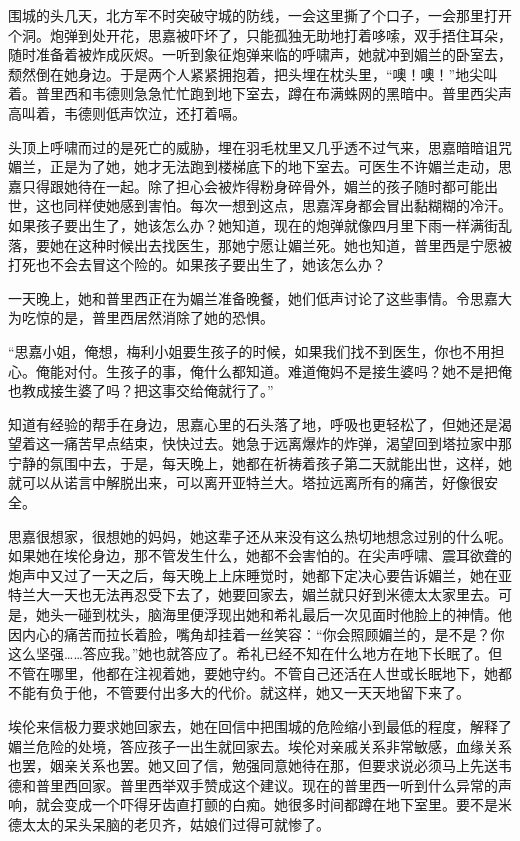 \par 围城的头几天，北方军不时突破守城的防线，一会这里撕了个口子，一会那里打开个洞。炮弹到处开花，思嘉被吓坏了，只能孤独无助地打着哆嗦，双手捂住耳朵，随时准备着被炸成灰烬。一听到象征炮弹来临的呼啸声，她就冲到媚兰的卧室去，颓然倒在她身边。于是两个人紧紧拥抱着，把头埋在枕头里，“噢！噢！”地尖叫着。普里西和韦德则急急忙忙跑到地下室去，蹲在布满蛛网的黑暗中。普里西尖声高叫着，韦德则低声饮泣，还打着嗝。
\par 头顶上呼啸而过的是死亡的威胁，埋在羽毛枕里又几乎透不过气来，思嘉暗暗诅咒媚兰，正是为了她，她才无法跑到楼梯底下的地下室去。可医生不许媚兰走动，思嘉只得跟她待在一起。除了担心会被炸得粉身碎骨外，媚兰的孩子随时都可能出世，这也同样使她感到害怕。每次一想到这点，思嘉浑身都会冒出黏糊糊的冷汗。如果孩子要出生了，她该怎么办？她知道，现在的炮弹就像四月里下雨一样满街乱落，要她在这种时候出去找医生，那她宁愿让媚兰死。她也知道，普里西是宁愿被打死也不会去冒这个险的。如果孩子要出生了，她该怎么办？
\par 一天晚上，她和普里西正在为媚兰准备晚餐，她们低声讨论了这些事情。令思嘉大为吃惊的是，普里西居然消除了她的恐惧。
\par “思嘉小姐，俺想，梅利小姐要生孩子的时候，如果我们找不到医生，你也不用担心。俺能对付。生孩子的事，俺什么都知道。难道俺妈不是接生婆吗？她不是把俺也教成接生婆了吗？把这事交给俺就行了。”
\par 知道有经验的帮手在身边，思嘉心里的石头落了地，呼吸也更轻松了，但她还是渴望着这一痛苦早点结束，快快过去。她急于远离爆炸的炸弹，渴望回到塔拉家中那宁静的氛围中去，于是，每天晚上，她都在祈祷着孩子第二天就能出世，这样，她就可以从诺言中解脱出来，可以离开亚特兰大。塔拉远离所有的痛苦，好像很安全。
\par 思嘉很想家，很想她的妈妈，她这辈子还从来没有这么热切地想念过别的什么呢。如果她在埃伦身边，那不管发生什么，她都不会害怕的。在尖声呼啸、震耳欲聋的炮声中又过了一天之后，每天晚上上床睡觉时，她都下定决心要告诉媚兰，她在亚特兰大一天也无法再忍受下去了，她要回家去，媚兰就只好到米德太太家里去。可是，她头一碰到枕头，脑海里便浮现出她和希礼最后一次见面时他脸上的神情。他因内心的痛苦而拉长着脸，嘴角却挂着一丝笑容：“你会照顾媚兰的，是不是？你这么坚强……答应我。”她也就答应了。希礼已经不知在什么地方在地下长眠了。但不管在哪里，他都在注视着她，要她守约。不管自己还活在人世或长眠地下，她都不能有负于他，不管要付出多大的代价。就这样，她又一天天地留下来了。
\par 埃伦来信极力要求她回家去，她在回信中把围城的危险缩小到最低的程度，解释了媚兰危险的处境，答应孩子一出生就回家去。埃伦对亲戚关系非常敏感，血缘关系也罢，姻亲关系也罢。她又回了信，勉强同意她待在那，但要求说必须马上先送韦德和普里西回家。普里西举双手赞成这个建议。现在的普里西一听到什么异常的声响，就会变成一个吓得牙齿直打颤的白痴。她很多时间都蹲在地下室里。要不是米德太太的呆头呆脑的老贝齐，姑娘们过得可就惨了。
